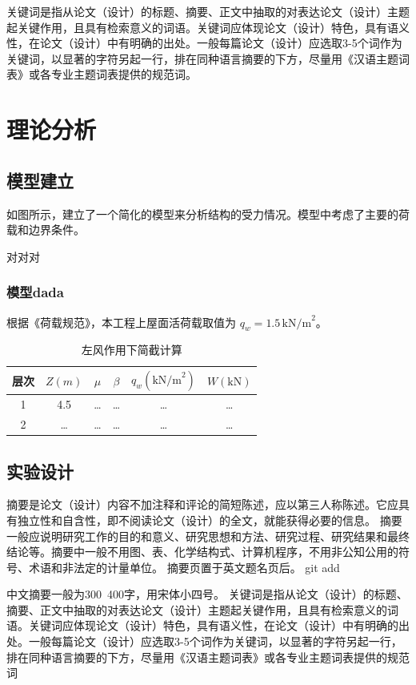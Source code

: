\documentclass{document}
\begin{document}
关键词是指从论文（设计）的标题、摘要、正文中抽取的对表达论文（设计）主题起关键作用，且具有检索意义的词语。关键词应体现论文（设计）特色，具有语义性，在论文（设计）中有明确的出处。一般每篇论文（设计）应选取3-5个词作为关键词，以显著的字符另起一行，排在同种语言摘要的下方，尽量用《汉语主题词表》或各专业主题词表提供的规范词。\cite{10.1145/3583780.3615277}  

\section{理论分析}

\subsection{模型建立}

如图所示，建立了一个简化的模型来分析结构的受力情况。模型中考虑了主要的荷载和边界条件。



对对对

\subsubsection{模型dada}
根据《荷载规范》，本工程上屋面活荷载取值为 $q_w = 1.5 \, \text{kN/m}^2$。

\begin{table}[htbp]
    \centering
    \caption{左风作用下简截计算}
    \begin{tabular}{cccccc}
      \toprule
      层次 & $Z(m)$ & $\mu$ & $\beta$ & $q_w (\text{kN/m}^2)$ & $W (\text{kN})$ \\
      \midrule
      1 & 4.5 & … & … & … & … \\
      2 & … & … & … & … & … \\
      \bottomrule
    \end{tabular}
\end{table}
\subsection{实验设计}
摘要是论文（设计）内容不加注释和评论的简短陈述，应以第三人称陈述。它应具有独立性和自含性，即不阅读论文（设计）的全文，就能获得必要的信息。
摘要一般应说明研究工作的目的和意义、研究思想和方法、研究过程、研究结果和最终结论等。摘要中一般不用图、表、化学结构式、计算机程序，不用非公知公用的符号、术语和非法定的计量单位。
摘要页置于英文题名页后。   git add

中文摘要一般为300~400字，用宋体小四号。 
关键词是指从论文（设计）的标题、摘要、正文中抽取的对表达论文（设计）主题起关键作用，且具有检索意义的词语。关键词应体现论文（设计）特色，具有语义性，在论文（设计）中有明确的出处。一般每篇论文（设计）应选取3-5个词作为关键词，以显著的字符另起一行，排在同种语言摘要的下方，尽量用《汉语主题词表》或各专业主题词表提供的规范词
\end{document}
